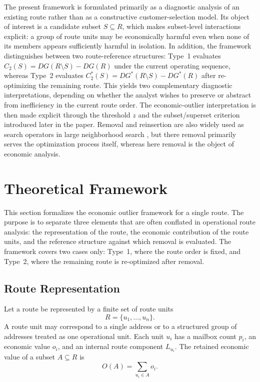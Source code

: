 \documentclass[preprint,12pt]{elsarticle}
\begin{document}
The present framework is formulated primarily as a diagnostic analysis of an existing route rather than as a constructive customer-selection model. Its object of interest is a candidate subset $S \subseteq R$, which makes subset-level interactions explicit: a group of route units may be economically harmful even when none of its members appears sufficiently harmful in isolation. In addition, the framework distinguishes between two route-reference structures: Type~1 evaluates $C_2(S)=DG(R\setminus S)-DG(R)$ under the current operating sequence, whereas Type~2 evaluates $C_2^*(S)=DG^*(R\setminus S)-DG^*(R)$ after re-optimizing the remaining route. This yields two complementary diagnostic interpretations, depending on whether the analyst wishes to preserve or abstract from inefficiency in the current route order. The economic-outlier interpretation is then made explicit through the threshold $z$ and the subset/superset criterion introduced later in the paper. Removal and reinsertion are also widely used as search operators in large neighborhood search \cite{pisinger2010large}, but there removal primarily serves the optimization process itself, whereas here removal is the object of economic analysis.

\section{Theoretical Framework}
\label{sec:theoretical-framework}

This section formalizes the economic outlier framework for a single route. The purpose is to separate three elements that are often conflated in operational route analysis: the representation of the route, the economic contribution of the route units, and the reference structure against which removal is evaluated. The framework covers two cases only: Type~1, where the route order is fixed, and Type~2, where the remaining route is re-optimized after removal.

\subsection{Route Representation}
\label{subsec:route-representation}

Let a route be represented by a finite set of route units
\[
R=\{u_1,\ldots,u_n\}.
\]
A route unit may correspond to a single address or to a structured group of addresses treated as one operational unit. Each unit $u_i$ has a mailbox count $p_i$, an economic value $o_i$, and an internal route component $L_{u_i}$. 
The retained economic value of a subset $A\subseteq R$ is
\[
O(A)=\sum_{u_i\in A}o_i.
\]
\end{document}
